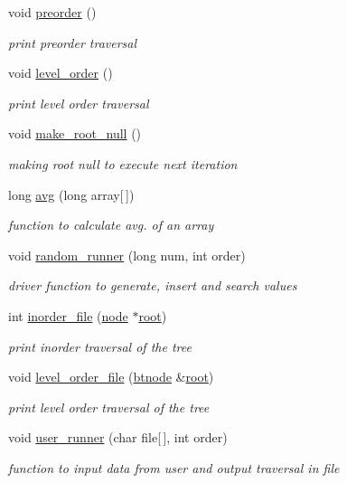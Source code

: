 \begin{DoxyCompactItemize}
void \hyperlink{class_btree_1_1utility_a727f33e9636c1fbd56f017fb696e9366}{preorder} ()
\begin{DoxyCompactList}\small\item\em print preorder traversal \end{DoxyCompactList}\item 
void \hyperlink{class_btree_1_1utility_a0e324dea11da1a7506902a9b27ba5d1c}{level\-\_\-order} ()
\begin{DoxyCompactList}\small\item\em print level order traversal \end{DoxyCompactList}\item 
void \hyperlink{class_btree_1_1utility_ab4516eb224c343ce53952c51c2257ce8}{make\-\_\-root\-\_\-null} ()
\begin{DoxyCompactList}\small\item\em making root null to execute next iteration \end{DoxyCompactList}\item 
long \hyperlink{class_btree_1_1utility_aaf28340f1e6f6e16e0a0cd765014b075}{avg} (long array\mbox{[}$\,$\mbox{]})
\begin{DoxyCompactList}\small\item\em function to calculate avg. of an array \end{DoxyCompactList}\item 
void \hyperlink{class_btree_1_1utility_a3f2ae2f39c7f908ddaca9b1a45d9c3c0}{random\-\_\-runner} (long num, int order)
\begin{DoxyCompactList}\small\item\em driver function to generate, insert and search values \end{DoxyCompactList}\item 
int \hyperlink{class_btree_1_1utility_abfaed921f7bfa93c86bf68fd252400fc}{inorder\-\_\-file} (\hyperlink{class_btree_1_1node}{node} $\ast$\hyperlink{class_btree_1_1utility_a240cdc9a802b5d396fb15ebf2bf1e3de}{root})
\begin{DoxyCompactList}\small\item\em print inorder traversal of the tree \end{DoxyCompactList}\item 
void \hyperlink{class_btree_1_1utility_a8388fec52c70801733166954a2d3cee0}{level\-\_\-order\-\_\-file} (\hyperlink{namespace_btree_af2177a710b4e16aaf0c14dcbbc01a9af}{btnode} \&\hyperlink{class_btree_1_1utility_a240cdc9a802b5d396fb15ebf2bf1e3de}{root})
\begin{DoxyCompactList}\small\item\em print level order traversal of the tree \end{DoxyCompactList}\item 
void \hyperlink{class_btree_1_1utility_a86a89ae68a8410223e7bc215749a93ab}{user\-\_\-runner} (char file\mbox{[}$\,$\mbox{]}, int order)
\begin{DoxyCompactList}\small\item\em function to input data from user and output traversal in file \end{DoxyCompactList}\end{DoxyCompactItemize}
